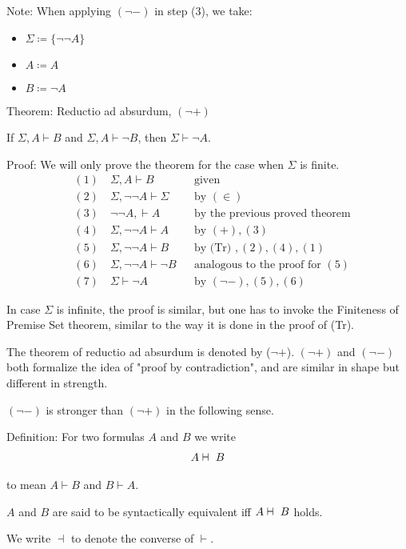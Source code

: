 \documentclass{article}
\newcommand{\vdashv}{%
    \mathrel{%
        \text{%
            \ooalign{$\vdash$ \cr $\dashv$ \cr}%
        }
    }
}
\begin{document}
Note: When applying $(\neg -)$ in step (3), we take:
\begin{itemize}
    \item $\Sigma \coloneqq \{\neg \neg A\}$ 
    \item $A \coloneqq A$
    \item $B \coloneqq \neg A$
\end{itemize}

Theorem: Reductio ad absurdum, $(\neg +)$

If $\Sigma, A \vdash B$ and $\Sigma, A \vdash \neg B$, then $\Sigma \vdash \neg A$. 

Proof: We will only prove the theorem for the case when $\Sigma$ is finite.
\begin{align*}
&(1) \quad \Sigma, A \vdash B &&\text{given} \\
&(2) \quad  \Sigma, \neg \neg A \vdash \Sigma &&\text{by } (\in ) \\
&(3) \quad  \neg \neg A, \vdash A &&\text{by the previous proved theorem} \\
&(4) \quad  \Sigma, \neg \neg A \vdash A &&\text{by } (+), (3) \\
&(5) \quad  \Sigma, \neg \neg A \vdash B &&\text{by (Tr) }, (2), (4), (1) \\
&(6) \quad  \Sigma, \neg \neg A \vdash \neg B &&\text{analogous to the proof for } (5) \\
&(7)  \quad \Sigma \vdash \neg A &&\text{by } (\neg -), (5), (6)
\end{align*}

In case $\Sigma$ is infinite, the proof is similar, but one has to invoke the Finiteness of Premise Set theorem, similar to the way it is done in the proof of (Tr).

The theorem of reductio ad absurdum is denoted by ($\neg +$). $(\neg +)$ and $(\neg -)$ both formalize the idea of "proof by contradiction", and are similar in shape but different in strength. 

$(\neg -)$ is stronger than $(\neg +)$ in the following sense. 


Definition: For two formulas $A$ and $B$ we write
\begin{align*}
A \vdashv B
\end{align*}

to mean $A \vdash B$ and $B \vdash A$.

$A$ and $B$ are said to be syntactically equivalent iff $A \vdashv B$ holds.

We write $\dashv$ to denote the converse of $\vdash$.
\end{document}
